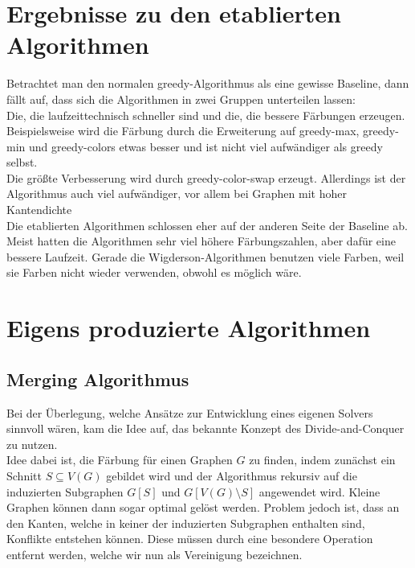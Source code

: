 \documentclass[11pt]{article}
\begin{document}
\section{Ergebnisse zu den etablierten Algorithmen} %

Betrachtet man den normalen greedy-Algorithmus als eine gewisse Baseline, dann fällt auf, dass sich die Algorithmen in zwei Gruppen unterteilen lassen: \\
Die, die laufzeittechnisch schneller sind und die, die bessere Färbungen erzeugen. Beispielsweise wird die Färbung durch die Erweiterung auf greedy-max, greedy-min und greedy-colors etwas besser und ist nicht viel aufwändiger als greedy selbst. \\
Die größte Verbesserung wird durch greedy-color-swap erzeugt. Allerdings ist der Algorithmus auch viel aufwändiger, vor allem bei Graphen mit hoher Kantendichte \\ %
Die etablierten Algorithmen schlossen eher auf der anderen Seite der Baseline ab. Meist hatten die Algorithmen sehr viel höhere Färbungszahlen, aber dafür eine bessere Laufzeit.
Gerade die Wigderson-Algorithmen benutzen viele Farben, weil sie Farben nicht wieder verwenden, obwohl es möglich wäre. \\


\section{Eigens produzierte Algorithmen} %
\subsection{Merging Algorithmus}
Bei der Überlegung, welche Ansätze zur Entwicklung eines eigenen Solvers sinnvoll wären,
kam die Idee auf, das bekannte Konzept des Divide-and-Conquer zu nutzen.\\
Idee dabei ist, die Färbung für einen Graphen $G$ zu finden, 
indem zunächst ein Schnitt $S\subseteq V(G)$ gebildet wird 
und der Algorithmus rekursiv auf die induzierten Subgraphen 
$G[S]$ und $G[V(G)\setminus S]$ angewendet wird.
Kleine Graphen können dann sogar optimal gelöst werden. 
Problem jedoch ist, dass an den Kanten, 
welche in keiner der induzierten Subgraphen enthalten sind,
Konflikte entstehen können. Diese müssen durch eine besondere Operation entfernt werden, 
welche wir nun als Vereinigung bezeichnen.\par
\end{document}
